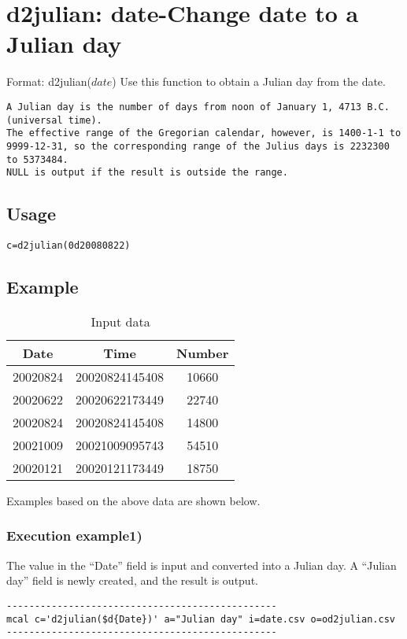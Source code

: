 
%

\section{d2julian: date-Change date to a Julian day\label{sect:d2julian}}

Format: d2julian($date$)
Use this function to obtain a Julian day from the date.
\begin{verbatim}
A Julian day is the number of days from noon of January 1, 4713 B.C. (universal time).
The effective range of the Gregorian calendar, however, is 1400-1-1 to 9999-12-31, so the corresponding range of the Julius days is 2232300 to 5373484.
NULL is output if the result is outside the range.
\end{verbatim}

\subsection*{Usage}
\begin{verbatim}
c=d2julian(0d20080822)
\end{verbatim}

\subsection*{Example}

\begin{table}[hbt]
\begin{center}
 \caption{Input data}
  \begin{tabular}{|c|c|c|} \hline
Date&Time&Number\\ \hline\hline
20020824&20020824145408&10660\\ \hline
20020622&20020622173449&22740\\ \hline
20020824&20020824145408&14800\\ \hline
20021009&20021009095743&54510\\ \hline
20020121&20020121173449&18750\\ \hline
  \end{tabular}
  \end{center}
\end{table}

Examples based on the above data are shown below.

\subsubsection*{Execution example1)}
The value in the “Date” field is input and converted into a Julian day. A “Julian day” field is newly created, and the result is output.
\begin{verbatim}
------------------------------------------------
mcal c='d2julian($d{Date})' a="Julian day" i=date.csv o=od2julian.csv
------------------------------------------------
\end{verbatim}

